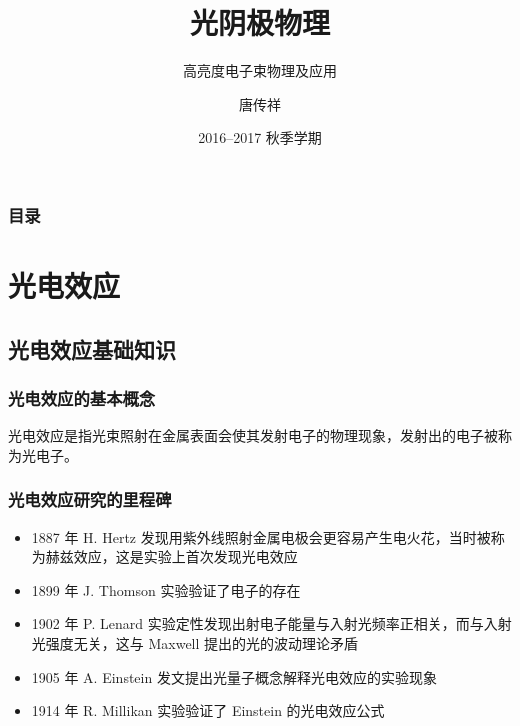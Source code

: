 \documentclass[ignorenonframetext, t]{beamer}
\title{光阴极物理}
\subtitle{高亮度电子束物理及应用}
\author{唐传祥}
\institute{清华大学工程物理系}
\date{2016--2017 秋季学期}
\begin{document}
\begin{frame}
  \titlepage
\end{frame}

\begin{frame}
  \frametitle{目录}
  \begin{multicols}{2}
  \tableofcontents
  \end{multicols}
\end{frame}

\section{光电效应}

\subsection{光电效应基础知识}

\begin{frame}[label=current]
  \frametitle{光电效应的基本概念}
  \begin{concept}
  	\alert{光电效应}是指光束照射在金属表面会使其发射电子的物理现象，发射出的电子被称为\alert{光电子}。
	\end{concept}
	
	
\end{frame}

\begin{frame}
  \frametitle{光电效应研究的里程碑}
  \begin{itemize}
	  \item 1887 年 H. Hertz 发现用紫外线照射金属电极会更容易产生电火花，当时被称为赫兹效应，这是实验上首次发现光电效应
	  \item 1899 年 J. Thomson 实验验证了电子的存在
	  \item 1902 年 P. Lenard 实验定性发现出射电子能量与入射光频率正相关，而与入射光强度无关，这与 Maxwell 提出的光的波动理论矛盾
		\item 1905 年 A. Einstein 发文提出光量子概念解释光电效应的实验现象
		\item 1914 年 R. Millikan 实验验证了 Einstein 的光电效应公式
  \end{itemize}
\end{frame}
\end{document}
